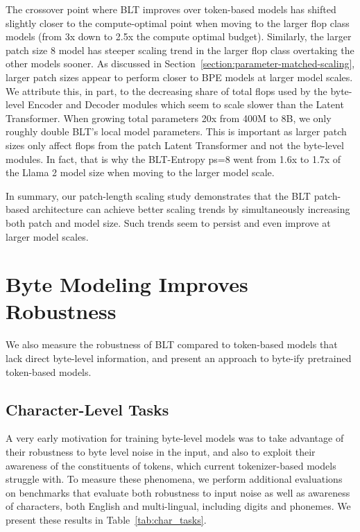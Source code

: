 The crossover point where {\textsc BLT} improves over token-based models has shifted slightly closer to the compute-optimal point when moving to the larger flop class models (from 3x down to 2.5x the compute optimal budget). Similarly, the larger patch size 8 model has steeper scaling trend in the larger flop class overtaking the other models sooner. As discussed in Section~\ref{section:parameter-matched-scaling}, larger patch sizes appear to perform closer to BPE models at larger model scales. We attribute this, in part, to the decreasing share of total flops used by the byte-level Encoder and Decoder modules which seem to scale slower than the Latent Transformer. When growing total parameters 20x from 400M to 8B, we only roughly double {\textsc BLT}'s local model parameters. This is important as larger patch sizes only affect flops from the patch Latent Transformer and not the byte-level modules. In fact, that is why the {\textsc BLT}-Entropy ps=8 went from 1.6x to 1.7x of the Llama 2 model size when moving to the larger model scale.

In summary, our patch-length scaling study demonstrates that the {\textsc BLT} patch-based architecture can achieve better scaling trends by simultaneously increasing both patch and model size. Such trends seem to persist and even improve at larger model scales.

\section{Byte Modeling Improves Robustness} We also measure the robustness of {\textsc BLT} compared to token-based models that lack direct byte-level information, and present an approach to byte-ify pretrained token-based models.
\label{sec:robustness}

\subsection{Character-Level Tasks}

A very early motivation for training byte-level models was to take advantage of their robustness to byte level noise in the input, and also to exploit their awareness of the constituents of tokens, which current tokenizer-based models struggle with. To measure these phenomena, we perform additional evaluations on benchmarks that evaluate both robustness to input noise as well as awareness of characters, both English and multi-lingual, including digits and phonemes. We present these results in Table~\ref{tab:char_tasks}.

